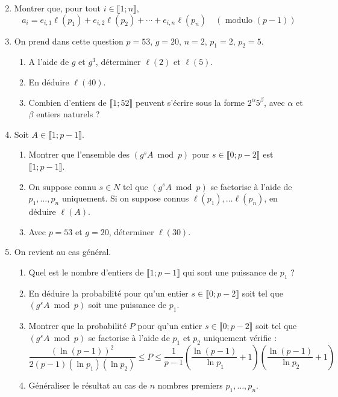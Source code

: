 \documentclass[landscape,twocolumn,leqno,a4paper,10pt]{report} %
\renewcommand{\leq}{\leqslant}
\begin{document}
\begin{enumerate}\setcounter{enumi}{1}
	\item Montrer que, pour tout $i \in\llbracket 1 ; n\rrbracket$,
	$$a_{i}=e_{i, 1} \ell\left(p_{1}\right)+e_{i, 2} \ell\left(p_{2}\right)+\cdots+e_{i, n} \ell\left(p_{n}\right) \quad(\text { modulo }(p-1))$$
	\item On prend dans cette question $p=53$, $g=20$, $n=2$, $p_{1}=2$, $p_{2}=5$.
	\begin{enumerate}
		\item A l'aide de $g$ et $g^{3}$, déterminer $\ell(2)$ et $\ell(5)$.
		\item En déduire $\ell(40)$.
		\item Combien d'entiers de $\llbracket 1 ; 52\rrbracket$ peuvent s'écrire sous la forme $2^{\alpha} 5^{\beta}$, avec $\alpha$ et $\beta$ entiers naturels ?
	\end{enumerate}
	\item Soit $A \in\llbracket 1 ; p-1\rrbracket$.
	\begin{enumerate}
		\item Montrer que l'ensemble des $\left(g^{s} A \bmod p\right)$ pour $s \in\llbracket 0 ; p-2\rrbracket$ est $\llbracket 1 ; p-1\rrbracket$.
		\item On suppose connu $s \in N$ tel que $\left(g^{s} A \bmod p\right)$ se factorise à l'aide de $p_{1}, \ldots, p_{n}$ uniquement. Si on suppose connus $\ell\left(p_{1}\right), \ldots \ell\left(p_{n}\right)$, en déduire $\ell(A)$.
		\item Avec $p=53$ et $g=20$, déterminer $\ell(30)$.
	\end{enumerate}
	\item On revient au cas général.
	\begin{enumerate}
		\item Quel est le nombre d'entiers de $\llbracket 1 ; p-1\rrbracket$ qui sont une puissance de $p_{1}$ ?
		\item En déduire la probabilité pour qu'un entier $s \in\llbracket 0 ; p-2\rrbracket$ soit tel que $\left(g^{s} A \bmod p\right)$ soit une puissance de $p_{1}$.
		\item Montrer que la probabilité $P$ pour qu'un entier $s \in\llbracket 0 ; p-2\rrbracket$ soit tel que $\left(g^{s} A \bmod p\right)$ se factorise à l'aide de $p_{1}$ et $p_{2}$ uniquement vérifie :
		$$\frac{(\ln (p-1))^{2}}{2(p-1)\left(\ln p_{1}\right)\left(\ln p_{2}\right)} \leq P \leq \frac{1}{p-1}\left(\frac{\ln (p-1)}{\ln p_{1}}+1\right)\left(\frac{\ln (p-1)}{\ln p_{2}}+1\right)$$
		\item Généraliser le résultat au cas de $n$ nombres premiers $p_{1}, \ldots, p_{n}$.
	\end{enumerate}
\end{enumerate}
\end{document}
